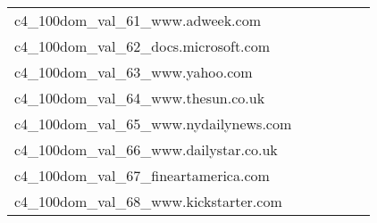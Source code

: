 {\begin{longtable}{m{6cm}m{1.7cm}m{1.7cm}m{1.7cm}m{1.7cm}m{1.7cm}}
	c4\_100dom\_val\_61\_www.adweek.com  & \colorbox[HTML]{fcfed9}{\makebox[\mywidth][c]{14.55}} & \colorbox[HTML]{bde395}{\makebox[\mywidth][c]{13.95}} & \colorbox[HTML]{ffffe5}{\makebox[\mywidth][c]{15.58}} & \colorbox[HTML]{e2f3a9}{\makebox[\mywidth][c]{14.09}} & \colorbox[HTML]{77c578}{\makebox[\mywidth][c]{13.81}}\\
	c4\_100dom\_val\_62\_docs.microsoft.com  & \colorbox[HTML]{c5e799}{\makebox[\mywidth][c]{7.69}} & \colorbox[HTML]{e4f4ab}{\makebox[\mywidth][c]{7.79}} & \colorbox[HTML]{ffffe5}{\makebox[\mywidth][c]{8.86}} & \colorbox[HTML]{bde395}{\makebox[\mywidth][c]{7.68}} & \colorbox[HTML]{77c578}{\makebox[\mywidth][c]{7.58}}\\
	c4\_100dom\_val\_63\_www.yahoo.com  & \colorbox[HTML]{fefee2}{\makebox[\mywidth][c]{9.29}} & \colorbox[HTML]{d0ec9e}{\makebox[\mywidth][c]{8.88}} & \colorbox[HTML]{ffffe5}{\makebox[\mywidth][c]{9.71}} & \colorbox[HTML]{d8efa2}{\makebox[\mywidth][c]{8.89}} & \colorbox[HTML]{77c578}{\makebox[\mywidth][c]{8.77}}\\
	c4\_100dom\_val\_64\_www.thesun.co.uk  & \colorbox[HTML]{fefee3}{\makebox[\mywidth][c]{12.18}} & \colorbox[HTML]{ecf7b1}{\makebox[\mywidth][c]{11.66}} & \colorbox[HTML]{ffffe5}{\makebox[\mywidth][c]{12.74}} & \colorbox[HTML]{def2a6}{\makebox[\mywidth][c]{11.59}} & \colorbox[HTML]{77c578}{\makebox[\mywidth][c]{11.39}}\\
	c4\_100dom\_val\_65\_www.nydailynews.com  & \colorbox[HTML]{ffffe5}{\makebox[\mywidth][c]{12.15}} & \colorbox[HTML]{ebf7b0}{\makebox[\mywidth][c]{11.60}} & \colorbox[HTML]{ffffe5}{\makebox[\mywidth][c]{12.61}} & \colorbox[HTML]{e5f4ab}{\makebox[\mywidth][c]{11.56}} & \colorbox[HTML]{77c578}{\makebox[\mywidth][c]{11.36}}\\
	c4\_100dom\_val\_66\_www.dailystar.co.uk  & \colorbox[HTML]{ffffe5}{\makebox[\mywidth][c]{10.65}} & \colorbox[HTML]{f3fab6}{\makebox[\mywidth][c]{10.17}} & \colorbox[HTML]{ffffe5}{\makebox[\mywidth][c]{11.03}} & \colorbox[HTML]{e2f3a9}{\makebox[\mywidth][c]{10.09}} & \colorbox[HTML]{77c578}{\makebox[\mywidth][c]{9.92}}\\
	c4\_100dom\_val\_67\_fineartamerica.com  & \colorbox[HTML]{ffffe5}{\makebox[\mywidth][c]{12.06}} & \colorbox[HTML]{f6fbb8}{\makebox[\mywidth][c]{11.58}} & \colorbox[HTML]{ffffe5}{\makebox[\mywidth][c]{12.29}} & \colorbox[HTML]{d1ec9f}{\makebox[\mywidth][c]{11.46}} & \colorbox[HTML]{77c578}{\makebox[\mywidth][c]{11.36}}\\
	c4\_100dom\_val\_68\_www.kickstarter.com  & \colorbox[HTML]{f5fbb7}{\makebox[\mywidth][c]{13.85}} & \colorbox[HTML]{c9e99b}{\makebox[\mywidth][c]{13.58}} & \colorbox[HTML]{ffffe5}{\makebox[\mywidth][c]{15.38}} & \colorbox[HTML]{bfe596}{\makebox[\mywidth][c]{13.55}} & \colorbox[HTML]{77c578}{\makebox[\mywidth][c]{13.38}}\\

\end{longtable}}
